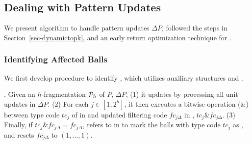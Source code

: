 \subsection{Dealing with Pattern Updates}
\label{subsec-Qinc}

We present algorithm \incp to handle pattern updates $\Delta P$, followed the steps in Section~\ref{sec-dynamictopk}, and
an early return optimization technique for \incp.










\subsubsection{Identifying Affected Balls}
\label{subsubsec-affball}

We first develop procedure \identifyaffball to identify \affballsx,
which utilizes auxiliary structures \fb and \bfc.

.
Given an $h$-fragmentation ${\cal P}_{h}$ of $P$, $\Delta P$,
(1) it updates \bfc by processing all unit updates in $\Delta P$.
(2) For each $j\in [1, 2^h]$, it then executes a bitwise  operation (\&) between type code $tc_j$ of \fs in \fb and updated filtering code $fc_{j\Delta}$ in \bfc, \ie $tc_j\& fc_{j\Delta}$.
(3) Finally, if $tc_j\& fc_{j\Delta} = fc_{j\Delta}$, \identifyaffball refers to \bs in \fb to mark the balls with type code $tc_j$ as \affballsx, and resets $fc_{j\Delta}$ to $(1, \ldots, 1)$.




